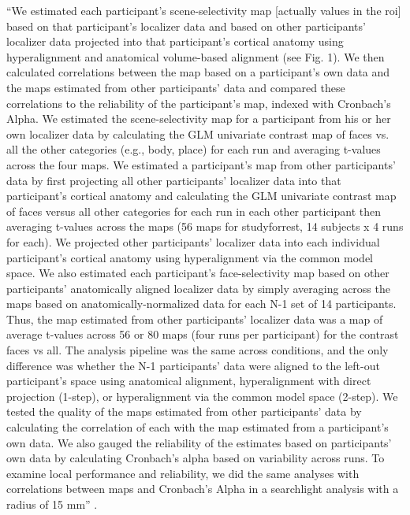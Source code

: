 %
``We estimated each participant's scene-selectivity map [actually values in the
\ac{roi}] based on that participant's localizer data and based on other
participants' localizer data projected into that participant's cortical anatomy
using hyperalignment and anatomical volume-based alignment (see Fig. 1).
%
We then calculated correlations between the map based on a participant's own
data and the maps estimated from other participants' data and compared these
correlations to the reliability of the participant's map, indexed with
Cronbach's Alpha.
%
We estimated the scene-selectivity map for a participant from his or her own
localizer data by calculating the GLM univariate contrast map of faces vs. all
the other categories (e.g., body, place) for each run and averaging t-values
across the four maps.
%
We estimated a participant's map from other participants' data by first
projecting all other participants' localizer data into that participant's
cortical anatomy and calculating the GLM univariate contrast map of faces versus
all other categories for each run in each other participant then averaging
t-values across the maps (56 maps for studyforrest, 14 subjects x 4 runs for
each).
%
We projected other participants' localizer data into each individual
participant's cortical anatomy using hyperalignment via the common model space.
%
We also estimated each participant's face-selectivity map based on other
participants' anatomically aligned localizer data by simply averaging across the
maps based on anatomically-normalized data for each N-1 set of 14 participants.
%
Thus, the map estimated from other participants' localizer data was a map of
average t-values across 56 or 80 maps (four runs per participant) for the
contrast faces vs all.
%
The analysis pipeline was the same across conditions, and the only difference
was whether the N-1 participants' data were aligned to the left-out
participant's space using anatomical alignment, hyperalignment with direct
projection (1-step), or hyperalignment via the common model space (2-step).
%
We tested the quality of the maps estimated from other participants' data by
calculating the correlation of each with the map estimated from a participant's
own data.
%
We also gauged the reliability of the estimates based on participants' own data
by calculating Cronbach's alpha based on variability across runs.
%
To examine local performance and reliability, we did the same analyses with
correlations between maps and Cronbach's Alpha in a searchlight analysis with a
radius of 15 mm'' \citep{jiahui2020predicting}.


